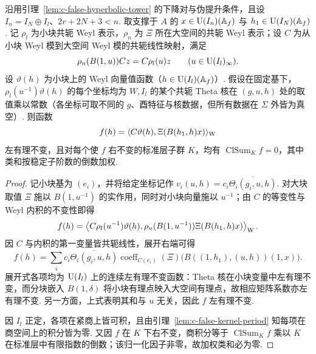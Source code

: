 \begin{lemma}
\label{lem:c-false-class-period}
\emitthmsource
沿用引理~\ref{lem:c-false-hyperbolic-tower} 的下降对与伪提升条件，且设 $I_n=I_N\oplus I_l$、$2r+2N+3<n$. 取支撑于 $A$ 的 $x\in \operatorname{U}(I_n)(\mathbb A_f)$ 与 $h_1\in \operatorname{U}(I_N)(\mathbb A_f)$. 记 $\rho_l$ 为小块共轭 Weyl 表示，$\rho_n$ 为 $\Xi$ 所在大空间的共轭 Weyl 表示；设 $C$ 为从小块 Weyl 模到大空间 Weyl 模的共轭线性映射，满足
\[
 \rho_n(B(1,u))Cz=C\rho_l(u)z
 \qquad (u\in \operatorname{U}(I_l)_\infty).
\]
设 $\vartheta(h)$ 为小块上的 Weyl 向量值函数（$h\in \operatorname{U}(I_l)(\mathbb A_f)$）. 假设在固定基下，$\rho_l(u^{-1})\vartheta(h)$ 的每个坐标均为 $W,I_l$ 的某个共轭 Theta 核在 $(g,u,h)$ 处的取值乘以常数（各坐标可取不同的 $g$、酉特征与核数据，但所有数据在 $\Sigma$ 外皆为真空）. 则函数
\[
 f(h)=\langle C\vartheta(h),\Xi(B(h_1,h)x)\rangle_{\rm W}
\]
左有理不变，且对每个使 $f$ 右不变的标准层子群 $K$，均有 $\operatorname{ClSum}_{K}f=0$，其中类和按稳定子阶数的倒数加权.
\end{lemma}

\begin{proof}
记小块基为 $(e_i)$，并将给定坐标记作 $v_i(u,h)=c_i\overline{\Theta_i(g_i,u,h)}$. 对大块取值 $\Xi$ 施以 $B(1,u^{-1})$ 的实作用，同时对小块向量施以 $u^{-1}$；由 $C$ 的等变性与 Weyl 内积的不变性即得
\[
 f(h)=\left\langle
   C\rho_l(u^{-1})\vartheta(h),
   \rho_n(B(1,u^{-1}))\Xi(B(h_1,h)x)
 \right\rangle_{\rm W}.
\]
因 $C$ 与内积的第一变量皆共轭线性，展开右端可得
\[
 f(h)=\sum_i c_i\overline{\Theta_i(g_i,u,h)}
       \operatorname{coeff}_{C(e_i)}(\Xi)
          \bigl(B((1,h_1),(u,h))(1,x)\bigr).
\]
展开式各项均为 $\operatorname{U}(I_l)$ 上的连续左有理不变函数：Theta 核在小块变量中左有理不变，而分块嵌入 $B(1,\delta)$ 将小块有理点映入大空间有理点，故相应矩阵系数亦左有理不变. 另一方面，上式表明其和与 $u$ 无关，因此 $f$ 左有理不变.

因 $I_l$ 正定，各项在紧商上皆可积，且由引理~\ref{lem:c-false-kernel-period} 知每项在商空间上的积分皆为零. 又因 $f$ 在 $K$ 下右不变，商积分等于 $\operatorname{ClSum}_K f$ 乘以 $K$ 在标准层中有限指数的倒数；该归一化因子非零，故加权类和必为零.
\end{proof}

